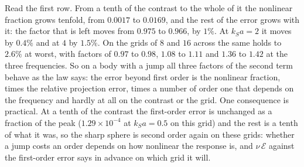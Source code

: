 \documentclass[11pt,a4paper]{article}
\newcommand{\cE}{\mathcal{E}}
\begin{document}
Read the first row. From a tenth of the contrast to the whole of it the nonlinear fraction grows
tenfold, from $0.0017$ to $0.0169$, and the rest of the error grows with it: the factor that is left
moves from $0.975$ to $0.966$, by $1\%$. At $k_Sa=2$ it moves by $0.4\%$ and at $4$ by $1.5\%$. On the
grids of $8$ and $16$ across the same holds to $2.6\%$ at worst, with factors of $0.97$ to
$0.98$, $1.08$ to $1.11$ and $1.36$ to $1.42$ at the three frequencies. So on a body with a jump all
three factors of the second term behave as the law says: the error beyond first order is the nonlinear
fraction, times the relative projection error, times a number of order one that depends on the frequency
and hardly at all on the contrast or the grid. One consequence is practical. At a tenth of the contrast
the first-order error is unchanged as a fraction of the peak ($1.29\times10^{-4}$ at $k_Sa=0.5$ on this
grid) and the rest is a tenth of what it was, so the sharp sphere is second order again on these grids:
whether a jump costs an order depends on how nonlinear the response is, and $\nu\,\cE$ against the
first-order error says in advance on which grid it will.
\end{document}
